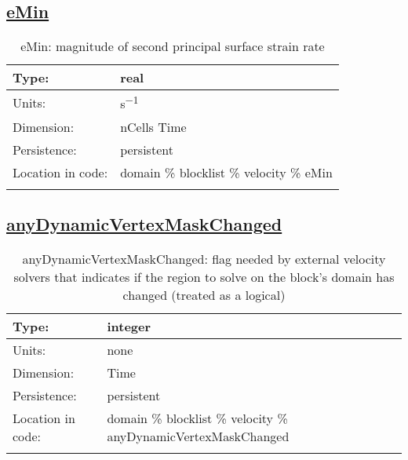 \subsection[eMin]{\hyperref[sec:var_tab_velocity]{eMin}}
\label{subsec:var_sec_velocity_eMin}
\begin{center}
\begin{longtable}{| p{2.0in} | p{4.0in} |}
        \hline 
        Type: & real \\
        \hline 
        Units: & \si{s^{-1}} \\
        \hline 
        Dimension: & nCells Time \\
        \hline 
        Persistence: & persistent \\
        \hline 
         Location in code: & domain \% blocklist \% velocity \% eMin \\
         \hline 
    \caption{eMin: magnitude of second principal surface strain rate}
\end{longtable}
\end{center}
\subsection[anyDynamicVertexMaskChanged]{\hyperref[sec:var_tab_velocity]{anyDynamicVertexMaskChanged}}
\label{subsec:var_sec_velocity_anyDynamicVertexMaskChanged}
\begin{center}
\begin{longtable}{| p{2.0in} | p{4.0in} |}
        \hline 
        Type: & integer \\
        \hline 
        Units: & \si{none} \\
        \hline 
        Dimension: & Time \\
        \hline 
        Persistence: & persistent \\
        \hline 
         Location in code: & domain \% blocklist \% velocity \% anyDynamicVertexMaskChanged \\
         \hline 
    \caption{anyDynamicVertexMaskChanged: flag needed by external velocity solvers that indicates if the region to solve on the block's domain has changed (treated as a logical)}
\end{longtable}
\end{center}
